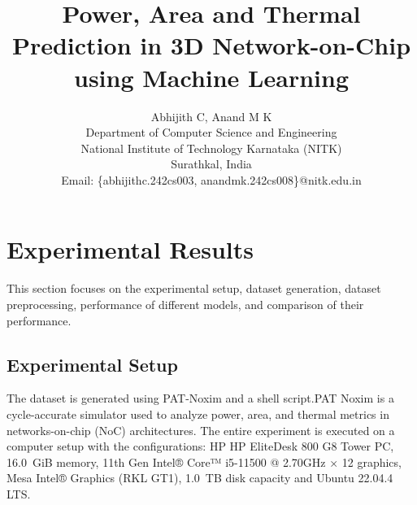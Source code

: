 \documentclass[conference]{IEEEtran}
\begin{document}
	
	\title{Power, Area and Thermal Prediction in 3D Network-on-Chip using Machine Learning}
	
	\author{Abhijith C, Anand M K \\
		
		Department of Computer Science and Engineering \\ 
		National Institute of Technology Karnataka (NITK) \\ 
		Surathkal, India\\
		Email: \{abhijithc.242cs003, anandmk.242cs008\}@nitk.edu.in}
	
	
	\maketitle
	
\section{Experimental Results}
This section focuses on the experimental setup, dataset generation, dataset preprocessing, performance of different models, and comparison of their performance.

	\subsection{Experimental Setup}
	The dataset is generated using PAT-Noxim and a shell script.PAT Noxim is a cycle-accurate simulator used to analyze power, area, and thermal metrics in networks-on-chip (NoC) architectures. The entire experiment is executed on a computer setup with the configurations: HP HP EliteDesk 800 G8 Tower PC, 16.0 GiB memory, 11th Gen Intel® Core™ i5-11500 @ 2.70GHz × 12 graphics, Mesa Intel® Graphics (RKL GT1), 1.0 TB disk capacity and Ubuntu 22.04.4 LTS.
	
\end{document}
